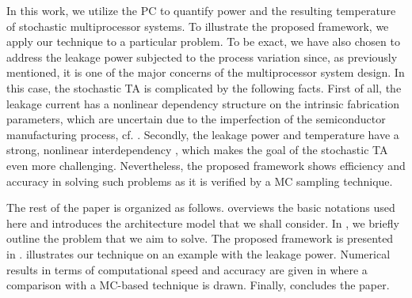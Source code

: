 In this work, we utilize the PC to quantify power and the resulting temperature of stochastic multiprocessor systems. To illustrate the proposed framework, we apply our technique to a particular problem. To be exact, we have also chosen to address the leakage power subjected to the process variation since, as previously mentioned, it is one of the major concerns of the multiprocessor system design. In this case, the stochastic TA is complicated by the following facts. First of all, the leakage current has a nonlinear dependency structure on the intrinsic fabrication parameters, which are uncertain due to the imperfection of the semiconductor manufacturing process, cf. \cite{juan2011, juan2012, srivastava2010}. Secondly, the leakage power and temperature have a strong, nonlinear interdependency \cite{liu2007}, which makes the goal of the stochastic TA even more challenging. Nevertheless, the proposed framework shows efficiency and accuracy in solving such problems as it is verified by a MC sampling technique.

The rest of the paper is organized as follows.  overviews the basic notations used here and introduces the architecture model that we shall consider. In , we briefly outline the problem that we aim to solve. The proposed framework is presented in .  illustrates our technique on an example with the leakage power. Numerical results in terms of computational speed and accuracy are given in  where a comparison with a MC-based technique is drawn. Finally,  concludes the paper.
